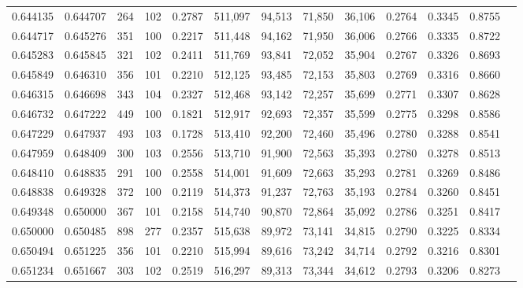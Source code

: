\begin{tabular}{rrrrrrrrrrrrr}
0.644135 & 0.644707 &    264 &   102 &                                     0.2787 & 511,097 &  94,513 &  71,850 &  36,106 & 0.2764 & 0.3345 & 0.8755 \\
0.644717 & 0.645276 &    351 &   100 &                                     0.2217 & 511,448 &  94,162 &  71,950 &  36,006 & 0.2766 & 0.3335 & 0.8722 \\
0.645283 & 0.645845 &    321 &   102 &                                     0.2411 & 511,769 &  93,841 &  72,052 &  35,904 & 0.2767 & 0.3326 & 0.8693 \\
0.645849 & 0.646310 &    356 &   101 &                                     0.2210 & 512,125 &  93,485 &  72,153 &  35,803 & 0.2769 & 0.3316 & 0.8660 \\
0.646315 & 0.646698 &    343 &   104 &                                     0.2327 & 512,468 &  93,142 &  72,257 &  35,699 & 0.2771 & 0.3307 & 0.8628 \\
0.646732 & 0.647222 &    449 &   100 &                                     0.1821 & 512,917 &  92,693 &  72,357 &  35,599 & 0.2775 & 0.3298 & 0.8586 \\
0.647229 & 0.647937 &    493 &   103 &                                     0.1728 & 513,410 &  92,200 &  72,460 &  35,496 & 0.2780 & 0.3288 & 0.8541 \\
0.647959 & 0.648409 &    300 &   103 &                                     0.2556 & 513,710 &  91,900 &  72,563 &  35,393 & 0.2780 & 0.3278 & 0.8513 \\
0.648410 & 0.648835 &    291 &   100 &                                     0.2558 & 514,001 &  91,609 &  72,663 &  35,293 & 0.2781 & 0.3269 & 0.8486 \\
0.648838 & 0.649328 &    372 &   100 &                                     0.2119 & 514,373 &  91,237 &  72,763 &  35,193 & 0.2784 & 0.3260 & 0.8451 \\
0.649348 & 0.650000 &    367 &   101 &                                     0.2158 & 514,740 &  90,870 &  72,864 &  35,092 & 0.2786 & 0.3251 & 0.8417 \\
0.650000 & 0.650485 &    898 &   277 &                                     0.2357 & 515,638 &  89,972 &  73,141 &  34,815 & 0.2790 & 0.3225 & 0.8334 \\
0.650494 & 0.651225 &    356 &   101 &                                     0.2210 & 515,994 &  89,616 &  73,242 &  34,714 & 0.2792 & 0.3216 & 0.8301 \\
0.651234 & 0.651667 &    303 &   102 &                                     0.2519 & 516,297 &  89,313 &  73,344 &  34,612 & 0.2793 & 0.3206 & 0.8273 \\

\end{tabular}
